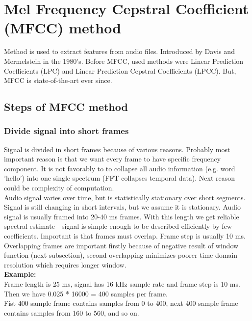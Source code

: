 \documentclass{article}
\begin{document}
\section{Mel Frequency Cepstral Coefficient (MFCC) method}

\begin{flushleft}
Method is used to extract features from audio files. Introduced by Davis and Mermelstein in the 1980's. Before MFCC, used methods were Linear Prediction Coefficients (LPC) and Linear Prediction Cepstral Coefficients (LPCC). But, MFCC is state-of-the-art ever since.
\end{flushleft}

\subsection{Steps of MFCC method}

\subsubsection{Divide signal into short frames}

Signal is divided in short frames because of various reasons. Probably most important reason is that we want every frame to have specific frequency component. It is not favorably to to collapse all audio information (e.g. word 'hello') into one single spectrum (FFT collapses temporal data). Next reason could be complexity of computation.\\
Audio signal varies over time, but is statistically stationary over short segments. Signal is still changing in short intervals, but we assume it is stationary. 
Audio signal is usually framed into 20-40 ms frames. With this length we get reliable spectral estimate - signal is simple enough to be described efficiently by few coefficients. Important is that frames must overlap. Frame step is usually 10 ms.\\
Overlapping frames are important firstly because of negative result of window function (next subsection), second overlapping minimizes poorer time domain resolution which requires longer window.
\\

\textbf{Example:}
\\
Frame length is 25 ms, signal has 16 kHz sample rate and frame step is 10 ms.
\\
Then we have 0.025 * 16000 = 400 samples per frame.
\\
Fist 400 sample frame contains samples from 0 to 400, next 400 sample frame contains samples from 160 to 560, 
and so on.
\\ 
\end{document}

